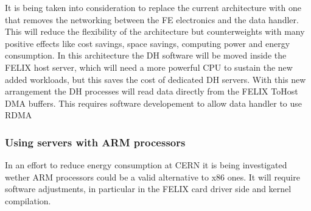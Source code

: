 It is being taken into consideration to replace the current architecture with one that removes the networking between the \acs{FE} electronics and the data handler. This will reduce the flexibility of the architecture but counterweights with many positive effects like cost savings, space savings, computing power and energy consumption. In this architecture the \acl{DH} software will be moved inside the \acs{FELIX} host server, which will need a more powerful CPU to sustain the new added workloads, but this saves the cost of dedicated \acs{DH} servers. With this new arrangement the \acs{DH} processes will read data directly from the \acs{FELIX} ToHost \acs{DMA} buffers.
This requires software developement to allow data handler to use \acs{RDMA}

\subsubsection{Using servers with ARM processors}

In an effort to reduce energy consumption at \acs{CERN} it is being investigated wether ARM processors could be a valid alternative to x86 ones. It will require software adjustments, in particular in the \acs{FELIX} card driver side and kernel compilation.
